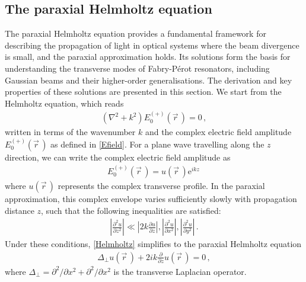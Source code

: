 \documentclass[../Thesis-IJspeert.tex]{subfiles}
\begin{document}
\subsection{The paraxial Helmholtz equation}
The paraxial Helmholtz equation provides a fundamental framework for describing the propagation of light in optical systems where the beam divergence is small, and the paraxial approximation holds. Its solutions form the basis for understanding the transverse modes of Fabry-Pérot resonators, including Gaussian beams and their higher-order generalisations. The derivation and key properties of these solutions are presented in this section. We start from the Helmholtz equation, which reads
\begin{align}
	\label{Helmholtz}
	\left(\nabla^2 + k^2\right) E_0^{(+)}(\vec{r}\,)=0\,,
\end{align}
written in terms of the wavenumber $k$ and the complex electric field amplitude $E_0^{(+)}(\vec{r}\,)$ as defined in \autoref{Efield}. For a plane wave travelling along the $z$ direction, we can write the complex electric field amplitude as
\begin{align}
	E_0^{(+)}(\vec{r}\,)=u(\vec{r}\,)\mathrm{e}^{ikz}\,
\end{align}
where $u(\vec{r}\,)$ represents the complex transverse profile. In the paraxial approximation, this complex envelope varies sufficiently slowly with propagation distance $z$, such that the following inequalities are satisfied:
\begin{align}
	\left\lvert \frac{\partial^2 u}{\partial z^2} \right\rvert \ll  \left\lvert 2k \frac{\partial u}{\partial z}\right\rvert , \left\lvert \frac{\partial^2 u}{\partial x^2} \right\rvert, \left\lvert \frac{\partial^2 u}{\partial y^2} \right\rvert \,.
\end{align}
Under these conditions, \autoref{Helmholtz} simplifies to the paraxial Helmholtz equation
\begin{align}
	\label{paraxialHelmholtz}
	\Delta_\perp u(\vec{r}\,)+2ik\frac{\partial}{\partial z}u(\vec{r}\,)=0\,,
\end{align}
where $\Delta_\perp={\partial^2}/{\partial x^2} + {\partial^2}/{\partial x^2}$ is the transverse Laplacian operator.
\end{document}
